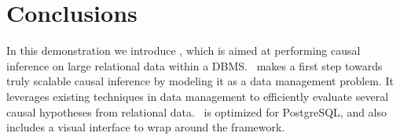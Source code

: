 \vspace{-.2cm}
\section{Conclusions}
In this demonstration we introduce \GSQL, which is aimed at
performing causal inference
on large relational data within a DBMS. \GSQL\ makes a first step towards truly scalable causal inference by modeling it as a data management problem. It leverages existing techniques
in data management to efficiently evaluate several causal hypotheses
from relational data. \GSQL\ is optimized for PostgreSQL, and also includes a visual interface to wrap around the framework.
